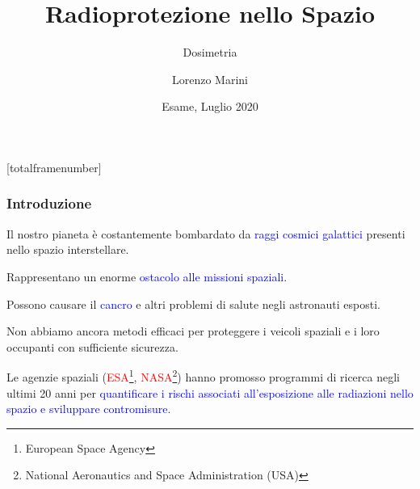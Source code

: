 \documentclass[9pt]{beamer}
\title{Radioprotezione nello Spazio}
\subtitle[]{Dosimetria}
\author{Lorenzo Marini}
\institute{Dipartimento di Fisica, Pisa}
\date[Luglio 2020] %
{Esame, Luglio 2020}
\begin{document}
[totalframenumber] 

\frame{\titlepage}



\begin{frame} 
  	\tableofcontents
\end{frame}


\begin{frame} [fragile]
	\frametitle{Introduzione}
	
Il nostro pianeta \`e costantemente bombardato da \textcolor{blue}{raggi cosmici galattici} presenti  nello spazio interstellare.
\newline

Rappresentano un enorme  \textcolor{blue}{ostacolo alle missioni spaziali}.
\newline
 
Possono causare il \textcolor{blue}{cancro} e altri problemi di salute negli astronauti esposti. 
\newline

Non abbiamo ancora metodi efficaci per proteggere i veicoli spaziali e i loro occupanti con sufficiente sicurezza.
 \newline
 
Le agenzie spaziali (\textcolor{red}{ESA}\footnote{European Space Agency}, \textcolor{red}{NASA}\footnote{National Aeronautics and Space Administration (USA)}) hanno promosso programmi di ricerca negli ultimi 20 anni per  \textcolor{blue}{quantificare i rischi associati all'esposizione alle radiazioni nello spazio e sviluppare contromisure}. 

\end{frame}
	
\end{document}
